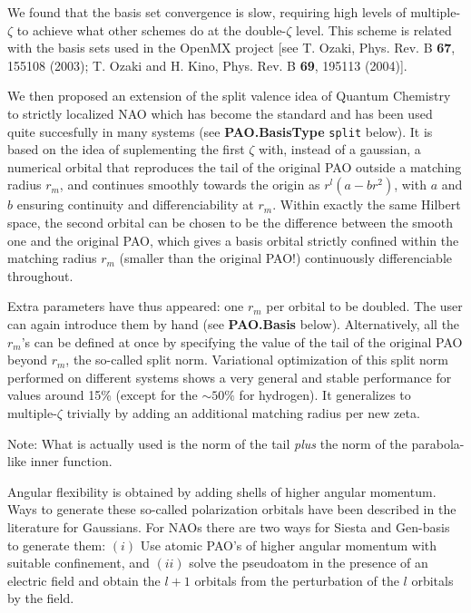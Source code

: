 \documentclass[11pt]{article}
\begin{document}
  We found that the basis set convergence is slow, requiring high levels
of multiple-$\zeta$ to achieve what other schemes do at the double-$\zeta$
level. 
  This scheme is related with the basis sets used in the OpenMX project
[see T. Ozaki, Phys. Rev. B {\bf 67}, 155108 (2003); T. Ozaki and H. Kino, 
Phys. Rev. B {\bf 69}, 195113 (2004)]. 

  We then proposed an extension of the split valence idea of Quantum Chemistry 
to strictly localized NAO which has become the standard and has been used
quite succesfully in many systems (see {\bf PAO.BasisType} {\tt split} below).
  It is based on the idea of suplementing the first $\zeta$ with, instead of
a gaussian, a numerical orbital that reproduces the tail of the original PAO 
outside a matching radius $r_{m}$, and continues smoothly towards the origin as 
$r^l(a-br^2)$, with $a$ and $b$ ensuring continuity and differenciability 
at $r_{m}$. 
  Within exactly the same
Hilbert space, the second orbital can be chosen to be the difference between
the smooth one and the original PAO, which gives a basis orbital strictly
confined within the matching radius $r_{m}$ (smaller than the
original PAO!) continuously differenciable throughout. 

  Extra parameters have thus appeared: one $r_m$ per orbital to be doubled. 
The user can again introduce them by hand (see {\bf PAO.Basis} below).
Alternatively, all the $r_m$'s can be defined at once by specifying
the value of the tail of the original PAO beyond $r_m$, the so-called
split norm. Variational optimization
of this split norm performed on different systems
shows a very general and stable performance for values around
15\% (except for the $\sim 50\%$ for hydrogen). 
  It generalizes to multiple-$\zeta$ trivially by adding an additional
matching radius per new zeta.

Note: What is actually used is the norm of the tail {\em plus} the
norm of the parabola-like inner function.

  Angular flexibility is obtained by adding shells of higher angular 
momentum.
  Ways to generate these so-called polarization orbitals have been
described in the literature for Gaussians. 
  For NAOs there are two ways for {\sc Siesta} and {\sc Gen-basis} to
generate them: $(i)$ Use atomic PAO's of higher angular momentum with
suitable confinement, and $(ii)$ solve the pseudoatom in the presence
of an electric field and obtain the $l+1$ orbitals from the perturbation
of the $l$ orbitals by the field.
\end{document}
